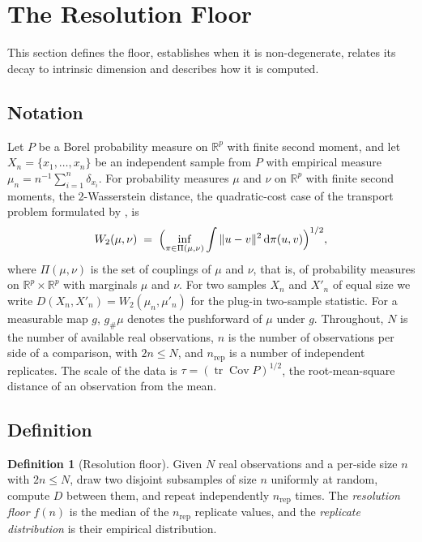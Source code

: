 \documentclass[twoside,11pt]{article}
\theoremstyle{plain}
\theoremstyle{definition}
\newtheorem{defn}{Definition}
\theoremstyle{remark}
\newcommand{\Wtwo}{\ensuremath{W_2}}
\DeclareMathOperator{\Cov}{Cov}
\newcommand{\R}{\ensuremath{\mathbb{R}}}
\begin{document}
\section{The Resolution Floor}\label{sec:floor}

This section defines the floor, establishes when it is non-degenerate,
relates its decay to intrinsic dimension and describes how it is computed.

\subsection{Notation}\label{sec:notation}

Let $P$ be a Borel probability measure on $\R^p$ with finite second moment,
and let $X_n = \{x_1, \dots, x_n\}$ be an independent sample from $P$ with
empirical measure $\mu_n = n^{-1}\sum_{i=1}^{n} \delta_{x_i}$. For
probability measures $\mu$ and $\nu$ on $\R^p$ with finite second moments,
the 2-Wasserstein distance, the quadratic-cost case of the transport
problem formulated by \citet{kantorovich1942}, is
\[
  \Wtwo(\mu, \nu)
  \;=\;
  \Bigl( \inf_{\pi \in \Pi(\mu, \nu)}
  \int \|u - v\|^2 \, \mathrm{d}\pi(u, v) \Bigr)^{1/2},
\]
where $\Pi(\mu,\nu)$ is the set of couplings of $\mu$ and $\nu$, that is,
of probability measures on $\R^p \times \R^p$ with marginals $\mu$ and
$\nu$. For two samples $X_n$ and $X'_n$ of equal size we write
$D(X_n, X'_n) = \Wtwo(\mu_n, \mu'_n)$ for the plug-in two-sample statistic.
For a measurable map $g$, $g_{\#}\mu$ denotes the pushforward of $\mu$
under $g$. Throughout, $N$ is the number of available real observations,
$n$ is the number of observations per side of a comparison, with
$2n \leq N$, and $n_{\mathrm{rep}}$ is a number of independent replicates.
The scale of the data is $\tau = (\operatorname{tr}\Cov P)^{1/2}$, the
root-mean-square distance of an observation from the mean.

\subsection{Definition}\label{sec:floor-def}

\begin{defn}[Resolution floor]\label{def:floor}
Given $N$ real observations and a per-side size $n$ with $2n \leq N$, draw
two disjoint subsamples of size $n$ uniformly at random, compute $D$
between them, and repeat independently $n_{\mathrm{rep}}$ times. The
\emph{resolution floor} $f(n)$ is the median of the $n_{\mathrm{rep}}$
replicate values, and the \emph{replicate distribution} is their empirical
distribution.
\end{defn}
\end{document}
